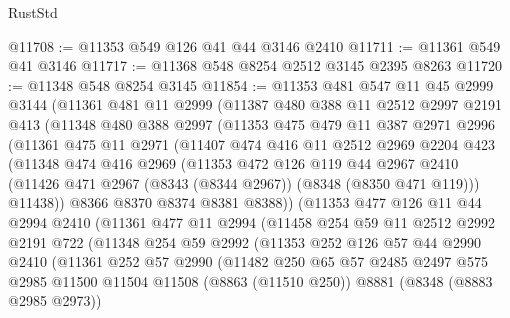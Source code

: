 \begin{lexlean}{RustStd}
\begin{coremodule}
{\begin{coremodule}
{{{{{{{{{{{{{{{{{{{{{{{{{{{{{{{{{{{{{{{{{{{{{{{{{{@11708 := @11353 @549 @126 @41 @44 @3146 @2410
@11711 := @11361 @549 @41 @3146
@11717 := @11368 @548 @8254 @2512 @3145 @2395 @8263
@11720 := @11348 @548 @8254 @3145
@11854 := @11353
    @481
    @547
    @11
    @45
    @2999
    @3144
    (@11361
      @481
      @11
      @2999
      (@11387
        @480
        @388
        @11
        @2512
        @2997
        @2191
        @413
        (@11348
          @480
          @388
          @2997
          (@11353
            @475
            @479
            @11
            @387
            @2971
            @2996
            (@11361
              @475
              @11
              @2971
              (@11407
                @474
                @416
                @11
                @2512
                @2969
                @2204
                @423
                (@11348
                  @474
                  @416
                  @2969
                  (@11353
                    @472
                    @126
                    @119
                    @44
                    @2967
                    @2410
                    (@11426 @471 @2967 (@8343 (@8344 @2967)) (@8348 (@8350 @471 @119)))
                    @11438))
                @8366
                @8370
                @8374
                @8381
                @8388))
            (@11353
              @477
              @126
              @11
              @44
              @2994
              @2410
              (@11361
                @477
                @11
                @2994
                (@11458
                  @254
                  @59
                  @11
                  @2512
                  @2992
                  @2191
                  @722
                  (@11348
                    @254
                    @59
                    @2992
                    (@11353
                      @252
                      @126
                      @57
                      @44
                      @2990
                      @2410
                      (@11361
                        @252
                        @57
                        @2990
                        (@11482
                          @250
                          @65
                          @57
                          @2485
                          @2497
                          @575
                          @2985
                          @11500
                          @11504
                          @11508
                          (@8863 (@11510 @250))
                          @8881
                          (@8348 (@8883 @2985 @2973))
}}}}}}}}}}}}}}}}}}}}}}}}}}}}}}}}}}}}}}}}}}}}}}}}}}
\end{coremodule}}
\end{coremodule}
\end{lexlean}
